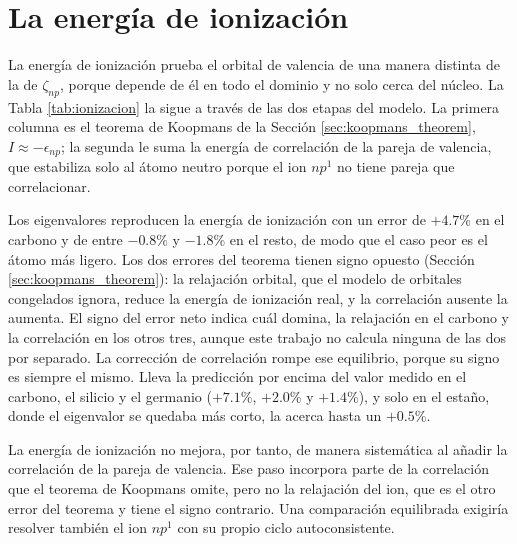 \section{La energía de ionización}
\label{sec:ionizacion}

La energía de ionización prueba el orbital de valencia de una manera distinta de la de $\zeta_{np}$, porque depende de él en todo el dominio y no solo cerca del núcleo. La Tabla \ref{tab:ionizacion} la sigue a través de las dos etapas del modelo. La primera columna es el teorema de Koopmans de la Sección \ref{sec:koopmans_theorem}, $I \approx -\epsilon_{np}$; la segunda le suma la energía de correlación de la pareja de valencia, que estabiliza solo al átomo neutro porque el ion $np^1$ no tiene pareja que correlacionar.

\begin{table}[htbp]
    \centering
    
    \caption[Energía de ionización en las dos etapas del modelo]{Energía de ionización (eV) en las dos etapas del modelo, con el error relativo frente al NIST entre paréntesis. HF+CI es $-\epsilon_{np} - E_{\text{corr}}$.}
    \label{tab:ionizacion}
\end{table}

Los eigenvalores reproducen la energía de ionización con un error de $+4.7\%$ en el carbono y de entre $-0.8\%$ y $-1.8\%$ en el resto, de modo que el caso peor es el átomo más ligero. Los dos errores del teorema tienen signo opuesto (Sección \ref{sec:koopmans_theorem}): la relajación orbital, que el modelo de orbitales congelados ignora, reduce la energía de ionización real, y la correlación ausente la aumenta. El signo del error neto indica cuál domina, la relajación en el carbono y la correlación en los otros tres, aunque este trabajo no calcula ninguna de las dos por separado. La corrección de correlación rompe ese equilibrio, porque su signo es siempre el mismo. Lleva la predicción por encima del valor medido en el carbono, el silicio y el germanio ($+7.1\%$, $+2.0\%$ y $+1.4\%$), y solo en el estaño, donde el eigenvalor se quedaba más corto, la acerca hasta un $+0.5\%$.

La energía de ionización no mejora, por tanto, de manera sistemática al añadir la correlación de la pareja de valencia. Ese paso incorpora parte de la correlación que el teorema de Koopmans omite, pero no la relajación del ion, que es el otro error del teorema y tiene el signo contrario. Una comparación equilibrada exigiría resolver también el ion $np^1$ con su propio ciclo autoconsistente.

